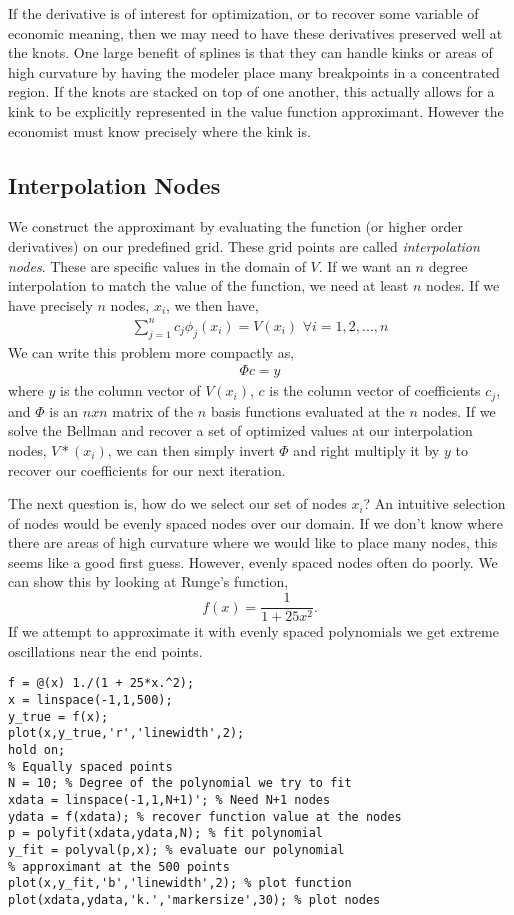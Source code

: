 \documentclass[11pt]{article}%
\begin{document}
If the derivative is of interest for optimization, or to recover some variable of economic meaning, then we may need to have these derivatives preserved well at the knots. One large benefit of splines is that they can handle kinks or areas of high curvature by having the modeler place many breakpoints in a concentrated region. If the knots are stacked on top of one another, this actually allows for a kink to be explicitly represented in the value function approximant. However the economist must know precisely where the kink is.

\subsection{Interpolation Nodes}
We construct the approximant by evaluating the function (or higher order derivatives) on our predefined grid. These grid points are called \emph{interpolation nodes}. These are specific values in the domain of $V$. If we want an $n$ degree interpolation to match the value of the function, we need at least $n$ nodes. If we have precisely $n$ nodes, $x_i$, we then have,
\begin{gather}
	\sum_{j=1}^n c_j \phi_j(x_i) = V(x_i) \,\, \forall i=1,2,...,n \tag{interpolation conditions}
\end{gather}
We can write this problem more compactly as,
\begin{gather}
	\Phi c = y \tag{interpolation equation}
\end{gather}
where $y$ is the column vector of $V(x_i)$, $c$ is the column vector of coefficients $c_j$, and $\Phi$ is an $nxn$ matrix of the $n$ basis functions evaluated at the $n$ nodes. If we solve the Bellman and recover a set of optimized values at our interpolation nodes, $V*(x_i)$, we can then simply invert $\Phi$ and right multiply it by $y$ to recover our coefficients for our next iteration.

The next question is, how do we select our set of nodes $x_i$? An intuitive selection of nodes would be evenly spaced nodes over our domain. If we don't know where there are areas of high curvature where we would like to place many nodes, this seems like a good first guess. However, evenly spaced nodes often do poorly. We can show this by looking at Runge's function,$$
f(x) = \frac{1}{1+25x^2}.$$
If we attempt to approximate it with evenly spaced polynomials we get extreme oscillations near the end points.
\begin{lstlisting}[frame=single]
% Create anonymous function of Runge's function
f = @(x) 1./(1 + 25*x.^2);
x = linspace(-1,1,500);
y_true = f(x);
plot(x,y_true,'r','linewidth',2);
hold on;
% Equally spaced points
N = 10; % Degree of the polynomial we try to fit
xdata = linspace(-1,1,N+1)'; % Need N+1 nodes
ydata = f(xdata); % recover function value at the nodes
p = polyfit(xdata,ydata,N); % fit polynomial
y_fit = polyval(p,x); % evaluate our polynomial 
% approximant at the 500 points
plot(x,y_fit,'b','linewidth',2); % plot function
plot(xdata,ydata,'k.','markersize',30); % plot nodes
\end{lstlisting}
\end{document}

